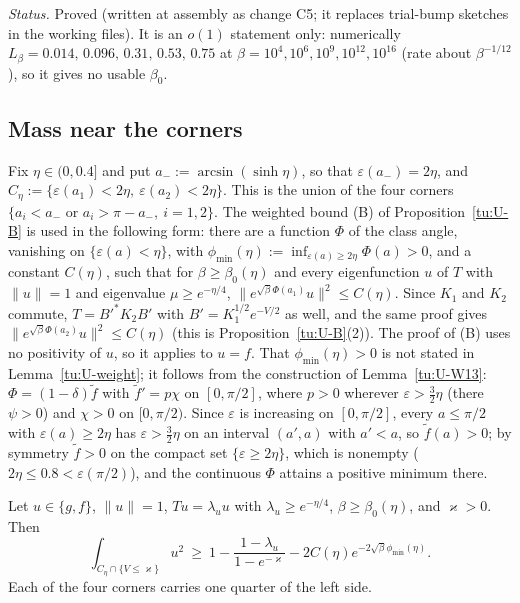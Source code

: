 \noindent\emph{Status.} Proved (written at assembly as change C5; it replaces trial-bump sketches in
the working files). It is an $o(1)$ statement only: numerically $L_\beta=0.014,\,0.096,\,0.31,\,0.53,\,0.75$
at $\beta=10^4,10^6,10^9,10^{12},10^{16}$ (rate about $\beta^{-1/12}$), so it gives no usable $\beta_0$.

\subsection{Mass near the corners}

Fix $\eta\in(0,0.4]$ and put $a_-:=\arcsin(\sinh\eta)$, so that $\varepsilon(a_-)=2\eta$, and
$C_\eta:=\{\varepsilon(a_1)<2\eta,\ \varepsilon(a_2)<2\eta\}$. This is the union of the four
corners $\{a_i<a_-\text{ or }a_i>\pi-a_-,\ i=1,2\}$. The weighted bound (B) of
Proposition~\ref{tu:U-B} is used in the following form: there are a function $\Phi$ of the class angle,
vanishing on $\{\varepsilon(a)<\eta\}$, with $\phi_{\min}(\eta):=\inf_{\varepsilon(a)\ge2\eta}\Phi(a)>0$,
and a constant $C(\eta)$, such that for $\beta\ge\beta_0(\eta)$ and every eigenfunction $u$ of $T$
with $\|u\|=1$ and eigenvalue $\mu\ge e^{-\eta/4}$, $\|e^{\sqrt\beta\Phi(a_1)}u\|^2\le C(\eta)$. Since
$K_1$ and $K_2$ commute, $T=B'^*K_2B'$ with $B'=K_1^{1/2}e^{-V/2}$ as well, and the same proof gives
$\|e^{\sqrt\beta\Phi(a_2)}u\|^2\le C(\eta)$ (this is Proposition~\ref{tu:U-B}(2)). The proof of (B) uses no positivity of $u$, so it applies to
$u=f$. That $\phi_{\min}(\eta)>0$ is not stated in Lemma~\ref{tu:U-weight}; it follows from the construction of
Lemma~\ref{tu:U-W13}: $\Phi=(1-\delta)\tilde f$ with $\tilde f'=p\chi$ on $[0,\pi/2]$, where $p>0$ wherever
$\varepsilon>\frac32\eta$ (there $\psi>0$) and $\chi>0$ on $[0,\pi/2)$. Since $\varepsilon$ is increasing on $[0,\pi/2]$, every
$a\le\pi/2$ with $\varepsilon(a)\ge2\eta$ has $\varepsilon>\frac32\eta$ on an interval $(a',a)$ with $a'<a$, so $\tilde f(a)>0$; by symmetry
$\tilde f>0$ on the compact set $\{\varepsilon\ge2\eta\}$, which is nonempty ($2\eta\le0.8<\varepsilon(\pi/2)$), and the continuous
$\Phi$ attains a positive minimum there.

\begin{lemma}[M4]\label{tu:L-M4}
Let $u\in\{g,f\}$, $\|u\|=1$, $Tu=\lambda_uu$ with $\lambda_u\ge e^{-\eta/4}$, $\beta\ge\beta_0(\eta)$,
and $\varkappa>0$. Then
\[
\int_{C_\eta\cap\{V\le\varkappa\}}u^2\ \ge\ 1-\frac{1-\lambda_u}{1-e^{-\varkappa}}-2C(\eta)e^{-2\sqrt\beta\phi_{\min}(\eta)} .
\]
Each of the four corners carries one quarter of the left side.
\end{lemma}

